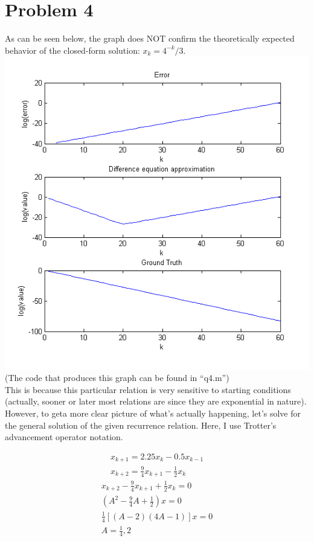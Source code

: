 \documentclass[paper=a4, fontsize=11pt]{scrartcl} %
\numberwithin{equation}{section} %
\numberwithin{figure}{section} %
\numberwithin{table}{section} %
\begin{document}
\section{Problem 4}
As can be seen below, the graph does NOT confirm the theoretically expected behavior of the closed-form solution: $x_k = 4^{-k}/3$. \\
\includegraphics{recurrenceGraph} \\
(The code that produces this graph can be found in ``q4.m'') \\
This is because this particular relation is very sensitive to starting conditions (actually, sooner or later most relations are since they are exponential in nature). However, to geta more clear picture of what's actually happening, let's solve for the general solution of the given recurrence relation. Here, I use Trotter's advancement operator notation.

\begin{align}
	x_{k + 1} = 2.25x_k - 0.5x_{k - 1} \\
	x_{k + 2} = \frac{9}{4}x_{k + 1} - \frac{1}{2}x_{k}
\end{align}
\begin{align}
	x_{k + 2} - \frac{9}{4}x_{k + 1} + \frac{1}{2}x_{k} = 0 \\
	(A^2 - \frac{9}{4}A + \frac{1}{2})x = 0 \\
	\frac{1}{4}[(A - 2)(4A - 1)]x = 0 \\
	A = \frac{1}{4}, 2
\end{align}
\end{document}
